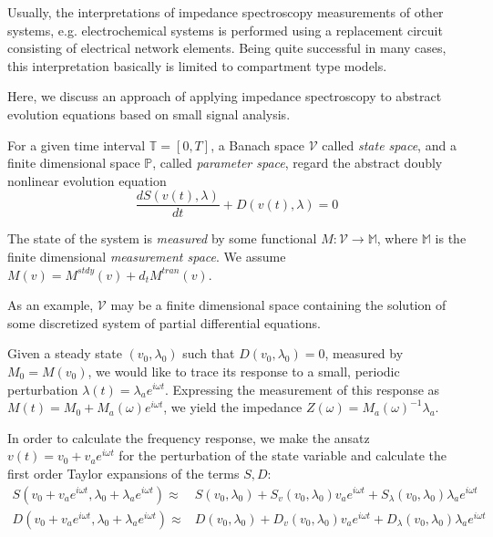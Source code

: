 \documentclass[12pt]{amsproc}
\newcommand{\CV}{{\mathcal{V}}}
\newcommand{\PP}{\mathbb{P}}
\newcommand{\TT}{\mathbb{T}}
\newcommand{\MM}{\mathbb{M}}
\newcommand{\Exp}[1]{e^{#1}}
\begin{document}
Usually, the interpretations of impedance spectroscopy measurements of
other  systems,  e.g. electrochemical  systems  is  performed using  a
replacement circuit consisting of  electrical network elements.  Being
quite  successful  in many  cases,  this  interpretation basically  is
limited to compartment type models.

Here,  we discuss an  approach of  applying impedance  spectroscopy to
abstract evolution equations based on small signal analysis.

For a  given time  interval $\TT=[0,T]$, a  Banach space  $\CV$ called
{\em state space},  and a finite dimensional space  $\PP$, called {\em
parameter  space},  regard  the  abstract doubly  nonlinear  evolution
equation
\begin{equation}\label{eq:abstrevol}
 \frac{d S(v(t),\lambda)}{dt} + D(v(t),\lambda)=0
\end{equation}

The state of  the system is {\em measured} by  some functional $M: \CV
\rightarrow  \MM$,   where  $\MM$  is  the   finite  dimensional  {\em
measurement space}. We assume  $M(v)=M^{stdy}(v)+ d_t M^{tran}(v)$.

As an example, $\CV$ may  be a finite dimensional space containing the
solution of some discretized system of partial differential equations.


Given   a  steady   state  $(v_0,   \lambda_0)$  such   that  $D(v_0,
\lambda_0)=0$, measured  by $M_0=M(v_0)$, we  would like to  trace its
response  to  a small,  periodic  perturbation $\lambda(t)=  \lambda_a
\Exp{i\omega  t}   $.   Expressing   the measurement of this  response  as   $M(t)=  M_0+
M_a(\omega)  \Exp{i\omega  t}$,  we  yield the  impedance  $Z(\omega)=
M_a(\omega)^{-1} \lambda_a$.



In order to calculate the frequency response, we make the ansatz $v(t)=v_0+v_a\Exp{i\omega  t}$ for
the perturbation of the state variable and calculate the first order Taylor expansions
of the terms $S,D$:
\begin{equation*}
  \begin{split}
    S(v_0+v_a\Exp{i\omega  t},\lambda_0+\lambda_a\Exp{i\omega  t})\approx&S(v_0,\lambda_0)+ 
          S_v(v_0,\lambda_0)v_a\Exp{i\omega  t}+
          S_\lambda(v_0,\lambda_0)\lambda_a\Exp{i\omega  t}\\
    D(v_0+v_a\Exp{i\omega  t},\lambda_0+\lambda_a\Exp{i\omega  t})\approx&D(v_0,\lambda_0)+ 
          D_v(v_0,\lambda_0)v_a\Exp{i\omega  t}+
          D_\lambda(v_0,\lambda_0)\lambda_a\Exp{i\omega  t}
  \end{split}
\end{equation*}
\end{document}
